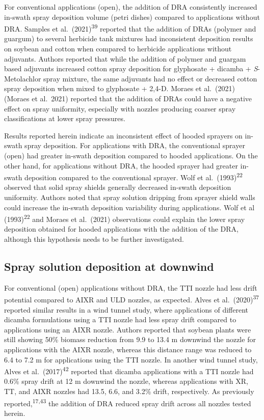\documentclass[
  12pt,
  a4paper,
]{article}
\begin{document}
For conventional applications (open), the addition of DRA consistently
increased in-swath spray deposition volume (petri dishes) compared to
applications without DRA. Samples et al.~(2021)\textsuperscript{39}
reported that the addition of DRAs (polymer and guargum) to several
herbicide tank mixtures had inconsistent deposition results on soybean
and cotton when compared to herbicide applications without adjuvants.
Authors reported that while the addition of polymer and guargam based
adjuvants increased cotton spray deposition for glyphosate + dicamba +
\emph{S}-Metolachlor spray mixture, the same adjuvants had no effect or
decreased cotton spray deposition when mixed to glyphosate + 2,4-D.
Moraes et al.~(2021) (Moraes et al.~2021) reported that the addition of
DRAs could have a negative effect on spray uniformity, especially with
nozzles producing coarser spray classifications at lower spray
pressures.

Results reported herein indicate an inconsistent effect of hooded
sprayers on in-swath spray deposition. For applications with DRA, the
conventional sprayer (open) had greater in-swath deposition compared to
hooded applications. On the other hand, for applications without DRA,
the hooded sprayer had greater in-swath deposition compared to the
conventional sprayer. Wolf et al.~(1993)\textsuperscript{22} observed
that solid spray shields generally decreased in-swath deposition
uniformity. Authors noted that spray solution dripping from sprayer
shield walls could increase the in-swath deposition variability during
applications. Wolf et al (1993)\textsuperscript{22} and Moraes et
al.~(2021) observations could explain the lower spray deposition
obtained for hooded applications with the addition of the DRA, although
this hypothesis needs to be further investigated.

\hypertarget{spray-solution-deposition-at-downwind-2}{%
\subsection{Spray solution deposition at
downwind}\label{spray-solution-deposition-at-downwind-2}}

For conventional (open) applications without DRA, the TTI nozzle had
less drift potential compared to AIXR and ULD nozzles, as expected.
Alves et al.~(2020)\textsuperscript{37} reported similar results in a
wind tunnel study, where applications of different dicamba formulations
using a TTI nozzle had less spray drift compared to applications using
an AIXR nozzle. Authors reported that soybean plants were still showing
50\% biomass reduction from 9.9 to 13.4 m downwind the nozzle for
applications with the AIXR nozzle, whereas this distance range was
reduced to 6.4 to 7.2 m for applications using the TTI nozzle. In
another wind tunnel study, Alves et al.~(2017)\textsuperscript{42}
reported that dicamba applications with a TTI nozzle had 0.6\% spray
drift at 12 m downwind the nozzle, whereas applications with XR, TT, and
AIXR nozzles had 13.5, 6.6, and 3.2\% drift, respectively. As previously
reported,\textsuperscript{17,43} the addition of DRA reduced spray drift
across all nozzles tested herein.
\end{document}
